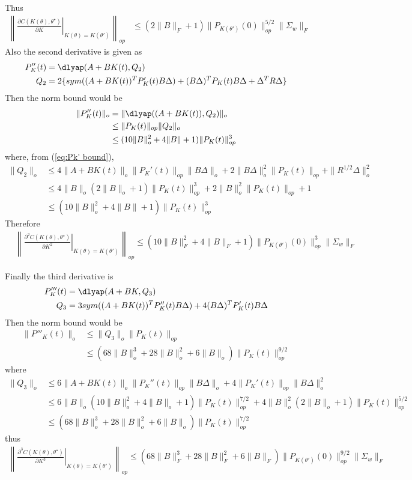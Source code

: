 Thus 
\begin{align}
    \left\|\left.\frac{\partial C(K(\theta), \theta^\star)}{\partial K}\right|_{K(\theta) = K(\theta')}\right\|_{op} 
    &\leq (2\|B\|_F+1)\|P_{K(\theta')}(0)\|^{5/2}_{op} \|\Sigma_w\|_F \label{eq:dC/dK bound}
\end{align}
Also the second derivative is given as
\begin{align*}
    P''_K(t) &= \dlyap(A+BK(t), Q_2) \\
    Q_2 &= 2\{sym((A+BK(t))^TP_K'(t)B\Delta) + (B\Delta)^TP_K(t)B\Delta + \Delta^TR\Delta\}
\end{align*}
Then the norm bound would be
\begin{align*}
    \|P_K''(t)\|_o &= \|\dlyap((A+BK(t)), Q_2)\|_o \\
    &\leq \|P_K(t)\|_{op}\|Q_2\|_o \\
    &\leq (10\|B\|_o^2 + 4\|B\| + 1)\|P_K(t)\|^{3}_{op}
\end{align*}
where, from (\ref{eq:Pk' bound}), 
\begin{align*}
    \|Q_2\|_o &\leq 4\|A+BK(t)\|_o\|P_K'(t)\|_{op}\|B\Delta\|_o + 2\|B\Delta\|_o^2\|P_K(t)\|_{op} + \|R^{1/2}\Delta\|^2_o \\
    &\leq 4\|B\|_o(2\|B\|_o+1)\|P_K(t)\|^{3}_{op} + 2\|B\|_o^2\|P_K(t)\|_{op} + 1 \\
    &\leq (10\|B\|_o^2 + 4\|B\| + 1)\|P_K(t)\|^{3}_{op}
\end{align*}
Therefore
\begin{align}
    &\left\|\left.\frac{\partial^2 C(K(\theta),\theta^\star)}{\partial K^2}\right|_{K(\theta) = K(\theta')}\right\|_{op} 
    \leq (10\|B\|_F^2 + 4\|B\|_F + 1)\|P_{K(\theta')}(0)\|^{3}_{op}\|\Sigma_w\|_F \label{eq:d2C/dK2 bound} 
\end{align}

Finally the third derivative is 
\begin{align*}
    P'''_K(t) &= \dlyap(A+BK, Q_3) \\
    Q_3 &= 3sym((A+BK(t))^TP_K''(t)B\Delta) + 4(B\Delta)^TP_K'(t)B\Delta 
\end{align*}
Then the norm bound would be
\begin{align*}
    \|P'''_K(t)\|_o &\leq \|Q_3\|_o\|P_K(t)\|_{op} \\
    &\leq (68\|B\|_o^3 + 28\|B\|_o^2 + 6\|B\|_o)\|P_K(t)\|^{9/2}_{op}
\end{align*}
where 
\begin{align*}
    \|Q_3\|_o &\leq 6\|A+BK(t)\|_o\|P_K''(t)\|_{op}\|B\Delta\|_o + 4\|P_K'(t)\|_{op} \|B\Delta\|_o^2 \\
    &\leq 6\|B\|_o(10\|B\|_o^2 + 4\|B\|_o + 1)\|P_K(t)\|^{7/2}_{op} + 4\|B\|_o^2(2\|B\|_o+1)\|P_K(t)\|^{5/2}_{op} \\
    &\leq (68\|B\|_o^3 + 28\|B\|_o^2 + 6\|B\|_o)\|P_K(t)\|^{7/2}_{op}
\end{align*}
thus 
\begin{align}
    \left\|\left.\frac{\partial^3 C(K(\theta), \theta^\star)}{\partial K^3}\right|_{K(\theta) = K(\theta')}\right\|_{op}\leq (68\|B\|_F^3 + 28\|B\|_F^2 + 6\|B\|_F)\|P_{K(\theta')}(0)\|^{9/2}_{op}\|\Sigma_w\|_F 
    \label{eq:d3C/dK3 bound}
\end{align}

